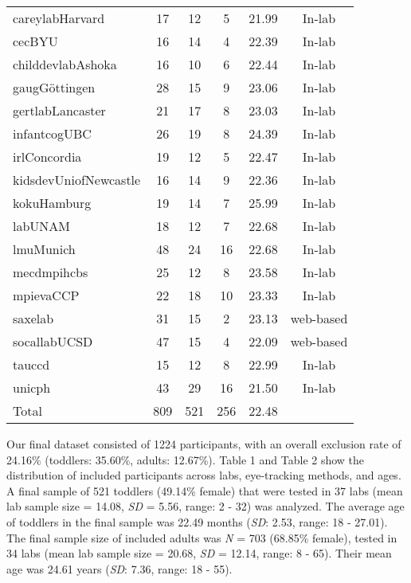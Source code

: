 \documentclass[
  man,floatsintext]{apa6}
\begin{document}
\begin{center}
\begin{ThreePartTable}
{\begin{longtable}{lccccc}
careylabHarvard & 17 & 12 & 5 & 21.99 & In-lab\\
cecBYU & 16 & 14 & 4 & 22.39 & In-lab\\
childdevlabAshoka & 16 & 10 & 6 & 22.44 & In-lab\\
gaugGöttingen & 28 & 15 & 9 & 23.06 & In-lab\\
gertlabLancaster & 21 & 17 & 8 & 23.03 & In-lab\\
infantcogUBC & 26 & 19 & 8 & 24.39 & In-lab\\
irlConcordia & 19 & 12 & 5 & 22.47 & In-lab\\
kidsdevUniofNewcastle & 16 & 14 & 9 & 22.36 & In-lab\\
kokuHamburg & 19 & 14 & 7 & 25.99 & In-lab\\
labUNAM & 18 & 12 & 7 & 22.68 & In-lab\\
lmuMunich & 48 & 24 & 16 & 22.68 & In-lab\\
mecdmpihcbs & 25 & 12 & 8 & 23.58 & In-lab\\
mpievaCCP & 22 & 18 & 10 & 23.33 & In-lab\\
saxelab & 31 & 15 & 2 & 23.13 & web-based\\
socallabUCSD & 47 & 15 & 4 & 22.09 & web-based\\
tauccd & 15 & 12 & 8 & 22.99 & In-lab\\
unicph & 43 & 29 & 16 & 21.50 & In-lab\\
Total & 809 & 521 & 256 & 22.48 & \\
\bottomrule
\end{longtable}

}

\end{ThreePartTable}
\end{center}

Our final dataset consisted of 1224 participants, with an overall exclusion rate of 24.16\% (toddlers: 35.60\%, adults: 12.67\%).
Table 1 and Table 2 show the distribution of included participants across labs, eye-tracking methods, and ages.
A final sample of 521 toddlers (49.14\% female) that were tested in 37 labs (mean lab sample size = 14.08, \emph{SD} = 5.56, range: 2 - 32) was analyzed.
The average age of toddlers in the final sample was 22.49 months (\emph{SD}: 2.53, range: 18 - 27.01).
The final sample size of included adults was \emph{N} = 703 (68.85\% female), tested in 34 labs (mean lab sample size = 20.68, \emph{SD} = 12.14, range: 8 - 65).
Their mean age was 24.61 years (\emph{SD}: 7.36, range: 18 - 55).
\end{document}
